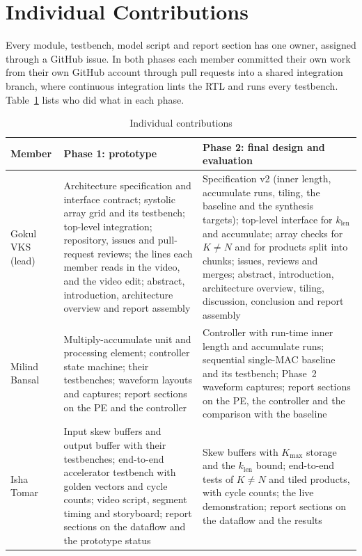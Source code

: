 
\section{Individual Contributions}
Every module, testbench, model script and report section has one owner, assigned through a GitHub issue. In both phases each member committed their own work from their own GitHub account through pull requests into a shared integration branch, where continuous integration lints the RTL and runs every testbench. Table~\ref{tab:contrib} lists who did what in each phase.

\begin{table}[t]
\centering
\caption{Individual contributions}
\label{tab:contrib}
\footnotesize
\begin{tabular}{@{}>{\raggedright\arraybackslash}p{}>{\raggedright\arraybackslash}p{}>{\raggedright\arraybackslash}p{}@{}}
\toprule
Member & Phase 1: prototype & Phase 2: final design and evaluation \\
\midrule
Gokul VKS (lead) & Architecture specification and interface contract; systolic array grid and its testbench; top-level integration; repository, issues and pull-request reviews; the lines each member reads in the video, and the video edit; abstract, introduction, architecture overview and report assembly & Specification v2 (inner length, accumulate runs, tiling, the baseline and the synthesis targets); top-level interface for $k_{\mathrm{len}}$ and accumulate; array checks for $K \neq N$ and for products split into chunks; issues, reviews and merges; abstract, introduction, architecture overview, tiling, discussion, conclusion and report assembly \\
\addlinespace
Milind Bansal & Multiply-accumulate unit and processing element; controller state machine; their testbenches; waveform layouts and captures; report sections on the PE and the controller & Controller with run-time inner length and accumulate runs; sequential single-MAC baseline and its testbench; Phase~2 waveform captures; report sections on the PE, the controller and the comparison with the baseline \\
\addlinespace
Isha Tomar & Input skew buffers and output buffer with their testbenches; end-to-end accelerator testbench with golden vectors and cycle counts; video script, segment timing and storyboard; report sections on the dataflow and the prototype status & Skew buffers with $K_{\max}$ storage and the $k_{\mathrm{len}}$ bound; end-to-end tests of $K \neq N$ and tiled products, with cycle counts; the live demonstration; report sections on the dataflow and the results \\

\end{tabular}
\end{table}
